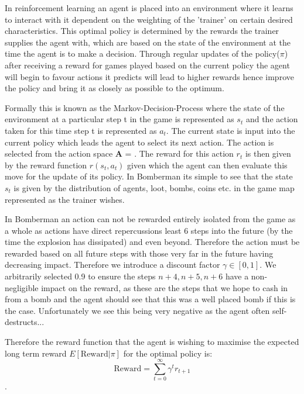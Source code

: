 In reinforcement learning an agent is placed into an environment where it learns to interact with it dependent on the weighting of the 'trainer' on certain desired characteristics. This optimal policy is determined by the rewards the trainer supplies the agent with, which are based on the state of the environment at the time the agent is to make a decision. Through regular updates of the policy($\pi$) after receiving a reward for games played based on the current policy the agent will begin to favour actions it predicts will lead to higher rewards hence improve the policy and bring it as closely as possible to the optimum.

Formally this is known as the Markov-Decision-Process where the state of the environment at a particular step t in the game is represented as \(s_t\) and the action taken for this time step t is represented as $a_t$. The current state is input into the current policy which leads the agent to select its next action. The action is selected from the action space \textbf{A} = . The reward for this action $r_t$ is then given by the reward function $r(s_t, a_t)$ given which the agent can then evaluate this move for the update of its policy. In Bomberman its simple to see that the state $s_t$ is given by the distribution of agents, loot, bombs, coins etc. in the game map represented as the trainer wishes. 

In Bomberman an action can not be rewarded entirely isolated from the game as a whole as actions have direct repercussions least 6 steps into the future (by the time the explosion has dissipated) and even beyond. Therefore the action must be rewarded based on all future steps with those very far in the future having decreasing impact. Therefore we introduce a discount factor $\gamma \in [0, 1]$. We arbitrarily selected 0.9 to ensure the steps $n+4, n+5, n+6$ have a non-negligible impact on the reward, as these are the steps that we hope to cash in from a bomb and the agent should see that this was a well placed bomb if this is the case. Unfortunately we see this being very negative as the agent often self-destructs...

Therefore the reward function that the agent is wishing to maximise the expected long term reward $E[\text{Reward}|\pi]$ for the optimal policy is: $$\text{Reward} = \sum_{t=0}^{\infty} \gamma^t r_{t+1}$$. 

